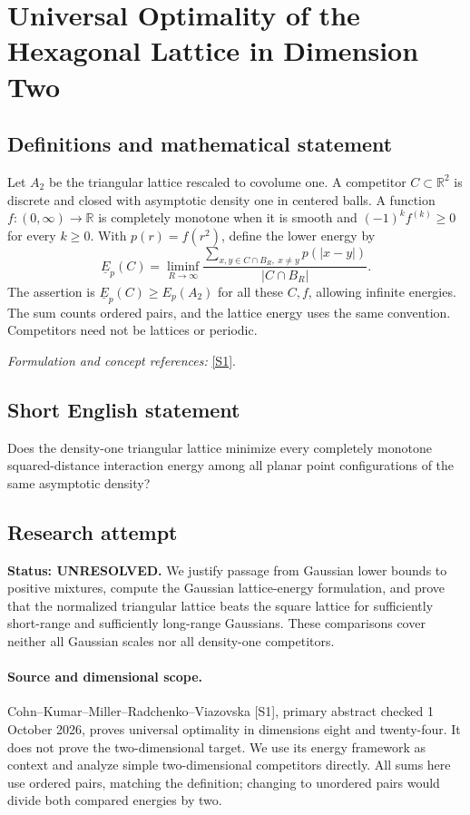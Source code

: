 \documentclass[11pt]{article}
\begin{document}
\section*{\texorpdfstring{Universal Optimality of the Hexagonal Lattice in Dimension Two}{Universal Optimality of the Hexagonal Lattice in Dimension Two}}\label{30006806}
\subsection{Definitions and mathematical statement}
Let $A_2$ be the triangular lattice rescaled to covolume one. A competitor $C\subset{\mathbb{R}}^2$ is discrete and closed with asymptotic density one in centered balls. A function $f:(0,\infty)\to{\mathbb{R}}$ is completely monotone when it is smooth and $(-1)^kf^{(k)}\ge0$ for every $k\ge0$. With $p(r)=f(r^2)$, define the lower energy by
\[
 \underline E_p(C)=\liminf_{R\to\infty}
 \frac{\sum_{x,y\in C\cap B_R,\ x\ne y}p(|x-y|)}{|C\cap B_R|}.
\]
The assertion is $\underline E_p(C)\ge E_p(A_2)$ for all these $C,f$, allowing infinite energies. The sum counts ordered pairs, and the lattice energy uses the same convention. Competitors need not be lattices or periodic.
\par\smallskip\textit{Formulation and concept references:} \href{https://arxiv.org/abs/1902.05438}{[S1]}.

\subsection{Short English statement}
Does the density-one triangular lattice minimize every completely monotone squared-distance interaction energy among all planar point configurations of the same asymptotic density?
\subsection{Research attempt}
\textbf{Status: UNRESOLVED.} We justify passage from Gaussian lower bounds to positive mixtures, compute the Gaussian lattice-energy formulation, and prove that the normalized triangular lattice beats the square lattice for sufficiently short-range and sufficiently long-range Gaussians. These comparisons cover neither all Gaussian scales nor all density-one competitors.

\paragraph{Source and dimensional scope.}
Cohn--Kumar--Miller--Radchenko--Viazovska [S1], primary abstract checked 1 October 2026, proves universal optimality in dimensions eight and twenty-four. It does not prove the two-dimensional target. We use its energy framework as context and analyze simple two-dimensional competitors directly. All sums here use ordered pairs, matching the definition; changing to unordered pairs would divide both compared energies by two.
\end{document}
